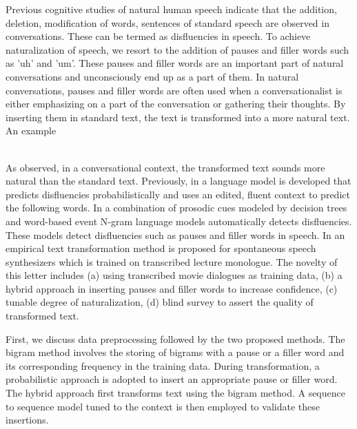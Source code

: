 \documentclass[journal]{IEEEtran}
\begin{document}
Previous cognitive studies of natural human speech indicate that the addition, deletion, modification of words, sentences of standard speech are observed in conversations. These can be termed as disfluencies in speech. To achieve naturalization of speech, we resort to the addition of pauses and filler words such as 'uh' and 'um'. These pauses and filler words are an important part of natural conversations and unconsciously end up as a part of them. In natural conversations, pauses and filler words are often used when a conversationalist is either emphasizing on a part of the conversation or gathering their thoughts. By inserting them in standard text, the text is transformed into a more natural text. An example

\noindent{}
\\

As observed, in a conversational context, the transformed text sounds more natural than the standard text. Previously, in \cite{stolcke1} a language model is developed that predicts disfluencies probabilistically and uses an edited, fluent context to predict the following words. In \cite{stolcke2} a combination of prosodic cues modeled by decision trees and word-based event N-gram language models automatically detects disfluencies. These models detect disfluencies such as pauses and filler words in speech. In \cite{sundaram} an empirical text transformation method is proposed for spontaneous speech synthesizers which is trained on transcribed lecture monologue. The novelty of this letter includes (a) using transcribed movie dialogues as training data, (b) a hybrid approach in inserting pauses and filler words to increase confidence, (c) tunable degree of naturalization, (d) blind survey to assert the quality of transformed text.

First, we discuss data preprocessing followed by the two proposed methods. The bigram method involves the storing of bigrams with a pause or a filler word and its corresponding frequency in the training data. During transformation, a probabilistic approach is adopted to insert an appropriate pause or filler word. The hybrid approach first transforms text using the bigram method. A sequence to sequence model tuned to the context is then employed to validate these insertions.
\end{document}
